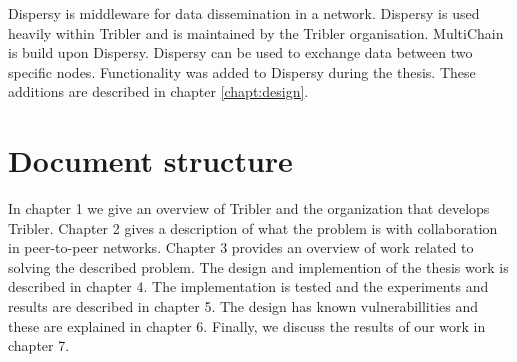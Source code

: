 Dispersy is middleware for data dissemination in a network.
Dispersy is used heavily within Tribler and is maintained by the Tribler organisation.
MultiChain is build upon Dispersy.
Dispersy can be used to exchange data between two specific nodes\cite{zeilemaker-dispersy}.
Functionality was added to Dispersy during the thesis.
These additions are described in chapter \ref{chapt:design}.

\section{Document structure}
In chapter 1 we give an overview of Tribler and the organization that develops Tribler.
Chapter 2 gives a description of what the problem is with collaboration in peer-to-peer networks.
Chapter 3 provides an overview of work related to solving the described problem.
The design and implemention of the thesis work is described in chapter 4.
The implementation is tested and the experiments and results are described in chapter 5.
The design has known vulnerabillities and these are explained in chapter 6.
Finally, we discuss the results of our work in chapter 7.
